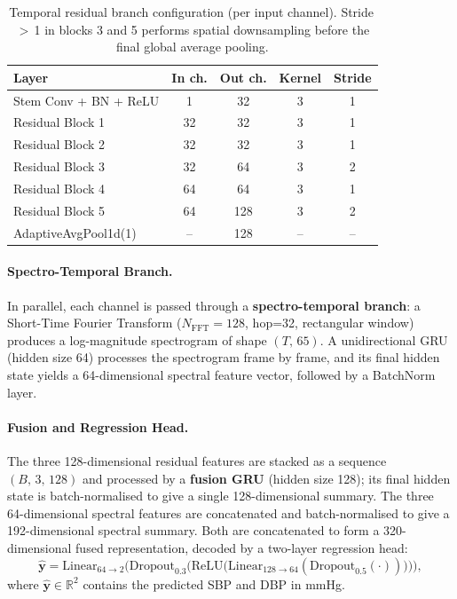 \begin{table}[htbp]
  \centering
  \caption{Temporal residual branch configuration (per input channel).
           Stride\,$>$\,1 in blocks 3 and 5 performs spatial downsampling
           before the final global average pooling.}
  \label{tab:resnet_blocks}
  \small
  \begin{tabular}{lcccc}
    \toprule
    \textbf{Layer} & \textbf{In ch.} & \textbf{Out ch.} & \textbf{Kernel} & \textbf{Stride} \\
    \midrule
    Stem Conv + BN + ReLU & 1  & 32  & 3 & 1 \\
    Residual Block 1      & 32 & 32  & 3 & 1 \\
    Residual Block 2      & 32 & 32  & 3 & 1 \\
    Residual Block 3      & 32 & 64  & 3 & 2 \\
    Residual Block 4      & 64 & 64  & 3 & 1 \\
    Residual Block 5      & 64 & 128 & 3 & 2 \\
    AdaptiveAvgPool1d(1)  & -- & 128 & -- & -- \\
    \bottomrule
  \end{tabular}
\end{table}

\paragraph{Spectro-Temporal Branch.}
In parallel, each channel is passed through a \textbf{spectro-temporal branch}: a Short-Time
Fourier Transform ($N_\text{FFT}=128$, hop=32, rectangular window) produces a log-magnitude
spectrogram of shape $(T,\,65)$.
A unidirectional GRU (hidden size 64) processes the spectrogram frame by frame, and its final
hidden state yields a 64-dimensional spectral feature vector, followed by a BatchNorm layer.

\paragraph{Fusion and Regression Head.}
The three 128-dimensional residual features are stacked as a sequence $(B,\,3,\,128)$ and
processed by a \textbf{fusion GRU} (hidden size 128); its final hidden state is
batch-normalised to give a single 128-dimensional summary.
The three 64-dimensional spectral features are concatenated and batch-normalised to give a
192-dimensional spectral summary.
Both are concatenated to form a 320-dimensional fused representation, decoded by a two-layer
regression head:
\[
  \hat{\mathbf{y}} =
    \mathrm{Linear}_{64\to2}\!\bigl(
      \mathrm{Dropout}_{0.3}\!\bigl(
        \mathrm{ReLU}\!\bigl(
          \mathrm{Linear}_{128\to64}(
            \mathrm{Dropout}_{0.5}(\cdot)
          )
        \bigr)
      \bigr)
    \bigr),
\]
where $\hat{\mathbf{y}} \in \mathbb{R}^2$ contains the predicted SBP and DBP in mmHg.


